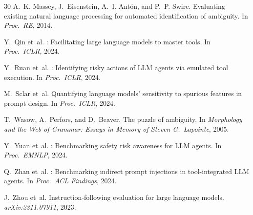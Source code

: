 \documentclass[11pt,a4paper]{article}
\begin{document}
\begin{thebibliography}{30}
A.~K. Massey, J.~Eisenstein, A.~I. Ant\'{o}n, and P.~P. Swire.
\newblock Evaluating existing natural language processing for automated identification of ambiguity.
\newblock In \emph{Proc.\ RE}, 2014.

Y.~Qin et~al.
: Facilitating large language models to master tools.
\newblock In \emph{Proc.\ ICLR}, 2024.

Y.~Ruan et~al.
: Identifying risky actions of {LLM} agents via emulated tool execution.
\newblock In \emph{Proc.\ ICLR}, 2024.

M.~Sclar et~al.
\newblock Quantifying language models' sensitivity to spurious features in prompt design.
\newblock In \emph{Proc.\ ICLR}, 2024.

T.~Wasow, A.~Perfors, and D.~Beaver.
\newblock The puzzle of ambiguity.
\newblock In \emph{Morphology and the Web of Grammar: Essays in Memory of Steven G.\ Lapointe}, 2005.

Y.~Yuan et~al.
: Benchmarking safety risk awareness for {LLM} agents.
\newblock In \emph{Proc.\ EMNLP}, 2024.

Q.~Zhan et~al.
: Benchmarking indirect prompt injections in tool-integrated {LLM} agents.
\newblock In \emph{Proc.\ ACL Findings}, 2024.

J.~Zhou et~al.
\newblock Instruction-following evaluation for large language models.
\newblock \emph{arXiv:2311.07911}, 2023.

\end{thebibliography}
\end{document}
